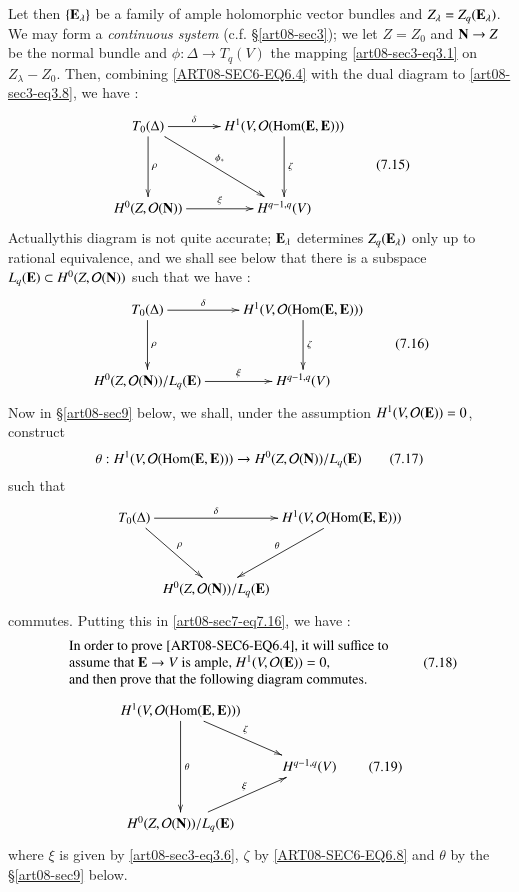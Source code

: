 Let then $\{\mathbf{E}_{\lambda}\}$ be a family of ample holomorphic vector bundles and $Z_{\lambda}=Z_{q}(\mathbf{E}_{\lambda})$. We may form a {\em continuous system} (c.f. \S\ref{art08-sec3}); we let $Z=Z_{0}$ and $\mathbf{N}\to Z$ be the normal bundle and $\phi:\Delta\to T_{q}(V)$ the mapping \eqref{art08-sec3-eq3.1} on $Z_{\lambda}-Z_{0}$. Then, combining \eqref{ART08-SEC6-EQ6.4} with the dual diagram to \eqref{art08-sec3-eq3.8}, we have :
\begin{equation*}
\vcenter{\xymatrix@R=1.5cm{
T_{0}(\Delta)\ar[r]^-{\delta}\ar[dr]^-{\phi_{*}}\ar[d]^-{\rho} & H^{1}(V,\mathcal{O}(\Hom(\bfE,\bfE)))\ar[d]^-{\zeta}\\
H^{0}(Z,\mathcal{O}(\bfN))\ar[r]^-{\xi} & H^{q-1,q}(V)
}}\tag{7.15}\label{art08-sec7-eq7.15}
\end{equation*}
Actually\pageoriginale this diagram is not quite accurate; $\mathbf{E}_{\lambda}$ determines $Z_{q}(\mathbf{E}_{\lambda})$ only up to rational equivalence, and we shall see below that there is a subspace $L_{q}(\mathbf{E})\subset H^{0}(Z,\mathcal{O}(\mathbf{N}))$ such that we have :
\begin{equation*}
\vcenter{\xymatrix@R=1.2cm{
T_{0}(\Delta)\ar[d]^-{\rho}\ar[r]^-{\delta} & H^{1}(V,\mathcal{O}(\Hom(\bfE,\bfE)))\ar[d]^-{\zeta}\\
H^{0}(Z,\mathcal{O}(\bfN))/L_{q}(\bfE)\ar[r]^-{\xi} & H^{q-1,q}(V)
}}\tag{7.16}\label{art08-sec7-eq7.16}
\end{equation*}
Now in \S\ref{art08-sec9} below, we shall, under the assumption $H^{1}(V,\mathcal{O}(\mathbf{E}))=0$, construct
\begin{equation*}
\theta : H^{1}(V,\mathcal{O}(\operatorname{\mathrm{Hom}}(\mathbf{E},\mathbf{E})))\to H^{0}(Z,\mathcal{O}(\mathbf{N}))/L_{q}(\mathbf{E})\tag{7.17}\label{art08-sec7-eq7.17}
\end{equation*}
such that
\[
\xymatrix@C=.1cm@R=1.2cm{
T_{0}(\Delta)\ar[rr]^-{\delta}\ar[dr]^-{\rho} & & H^{1}(V,\mathcal{O}(\Hom(\bfE,\bfE)))\ar[dl]_-{\theta}\\
 & H^{0}(Z,\mathcal{O}(\bfN))/L_{q}(\bfE) & 
}
\]
commutes. Putting this in \eqref{art08-sec7-eq7.16}, we have :
\begin{equation*}
\begin{array}{l}
\text{In order to prove \eqref{ART08-SEC6-EQ6.4}, it will suffice to}\\
\text{assume that $\mathbf{E}\to V$ is ample, $H^{1}(V,\mathcal{O}(\mathbf{E}))=0$,}\\
\text{and then prove that the following diagram commutes.}
\end{array}\tag{7.18}\label{art08-sec7-eq7.18}
\end{equation*}
\begin{equation*}
\vcenter{\xymatrix{
H^{1}(V,\mathcal{O}(\Hom(\bfE,\bfE)))\ar[dr]^-{\zeta}\ar[dd]^-{\theta} &\\
 & H^{q-1,q}(V)\\
H^{0}(Z,\mathcal{O}(\bfN))/L_{q}(\bfE)\ar[ur]^-{\xi} &
}}\tag{7.19}\label{art08-sec7-eq7.19}
\end{equation*}
where $\xi$ is given by \eqref{art08-sec3-eq3.6}, $\zeta$ by \eqref{ART08-SEC6-EQ6.8} and $\theta$ by the \S\ref{art08-sec9} below.

